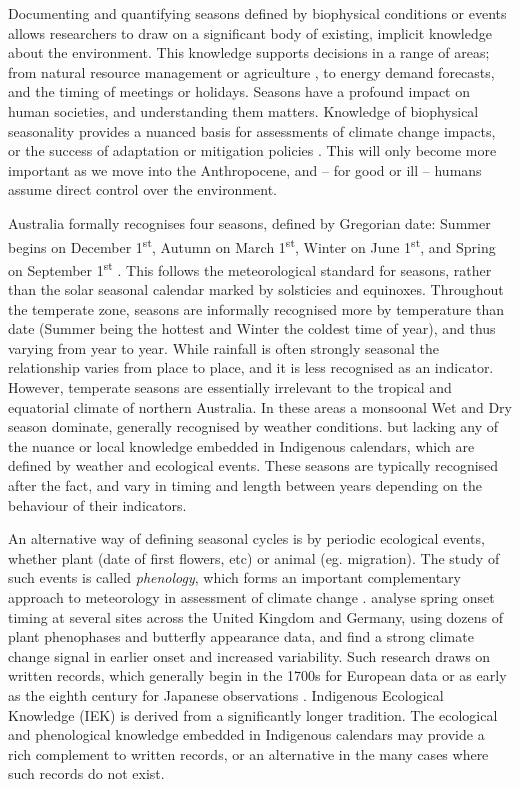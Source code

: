 Documenting and quantifying seasons defined by biophysical conditions
or events allows researchers to draw on a significant body of existing,
implicit knowledge about the environment.
%
This knowledge supports decisions in a range of areas; from natural
resource management or agriculture \citep{woodward2012a,ens2012}, to
energy demand forecasts, and the timing of meetings or holidays.
Seasons have a profound impact on human societies, and understanding
them matters.  Knowledge of biophysical seasonality provides a nuanced
basis for assessments of climate change impacts, or the success of
adaptation or mitigation policies \citep{green2010a,stevenson1996,prober2011}.
This will only become more important
as we move into the Anthropocene, and -- for good or ill -- humans assume
direct control over the environment.


Australia formally recognises four seasons, defined by Gregorian date:
Summer begins on December 1\textsuperscript{st}, Autumn on March
1\textsuperscript{st}, Winter on June 1\textsuperscript{st}, and Spring
on September 1\textsuperscript{st} \citep{wells2013}. This follows the
meteorological standard for seasons, rather
than the solar seasonal calendar marked by solsticies and equinoxes.
%
Throughout the temperate zone, seasons are informally recognised more by
temperature than date (Summer being the hottest and Winter the coldest time
of year), and thus varying from year to year.  While rainfall is often
strongly  seasonal the relationship varies from place to place, and it is
less recognised as an indicator.
%
However, temperate seasons are essentially irrelevant to the tropical and
equatorial climate of northern Australia.  In these areas a monsoonal Wet
and Dry season dominate, generally recognised by weather conditions.
but lacking any of the nuance or local knowledge embedded in Indigenous
calendars, which are defined by weather and ecological events.  These
seasons are typically recognised after the fact, and vary in timing and
length between years depending on the behaviour of their indicators.


An alternative way of defining seasonal cycles is by periodic ecological
events, whether plant (date of first flowers, etc) or animal (eg. migration).
The study of such events is called \textit{phenology}, which forms an
important complementary approach to meteorology in assessment of climate
change \citep[eg.][]{roy2000}.  \citet{menzel2006} analyse spring onset timing
at several sites across the United Kingdom and Germany, using dozens of
plant phenophases and butterfly appearance data, and find a strong climate
change signal in earlier onset and increased variability.  Such research
draws on written records, which generally begin in the 1700s for European
data or as early as the eighth century for Japanese observations \citep{sparks2002}.
%
Indigenous Ecological Knowledge (IEK) is derived from a significantly longer
tradition.  The ecological and phenological knowledge embedded
in Indigenous calendars may provide a rich complement to written records,
or an alternative in the many cases where such records do not exist.

